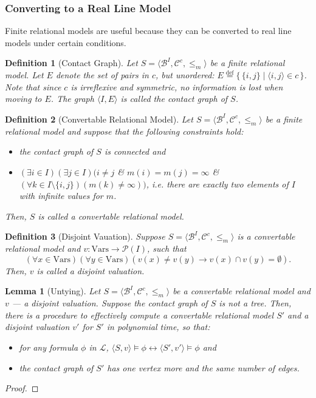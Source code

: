 \documentclass{article}
\newtheorem*{definition}{Definition}
\newtheorem*{lemma}{Lemma}
\newcommand{\pwrset}{\mathcal{P}}
\newcommand{\B}{\mathcal{B}}
\newcommand{\lang}{\mathcal{L}}
\newcommand{\Vars}{\text{Vars}}
\newcommand{\eqdef}{\stackrel{\text{def}}{=}}
\begin{document}
\subsubsection{Converting to a Real Line Model}
Finite relational models are useful because they can be converted to real line models under certain conditions.
\begin{definition}[Contact Graph]
  Let $S = \langle \B^I, \mathcal{C}^c, \leq_m \rangle$ be a finite relational model. Let $E$ denote the set of pairs in $c$, but unordered: $E \eqdef \{\, \{i, j\} \mid \langle i, j \rangle \in c \,\}$. Note that since $c$ is irreflexive and symmetric, no information is lost when moving to $E$.
  The graph $\langle I, E \rangle$ is called the \emph{contact graph} of $S$.
\end{definition}
\begin{definition}[Convertable Relational Model]
Let $S = \langle \B^I, \mathcal{C}^c, \leq_m \rangle$ be a finite relational model and suppose that the following constraints hold:
\begin{itemize}
\item the contact graph of $S$ is connected and
\item $(\exists i \in I)(\exists j \in I)(i \neq j$ \& $m(i) = m(j) = \infty$ \& $(\forall k \in I\setminus\{i, j\})(m(k) \neq \infty))$, i.e. there are exactly two elements of $I$ with infinite values for $m$.
\end{itemize}
Then, $S$ is called a \emph{convertable relational model}.
\end{definition}

\begin{definition}[Disjoint Vauation]
  Suppose $S = \langle \B^I, \mathcal{C}^c, \leq_m \rangle$ is a convertable relational model and $v: \Vars \rightarrow \pwrset(I)$, such that
\begin{equation*}
(\forall x \in \Vars)(\forall y \in \Vars)(v(x) \neq v(y) \rightarrow v(x) \cap v(y) = \emptyset).
\end{equation*}
Then, $v$ is called a \emph{disjoint valuation}.
\end{definition}

\begin{lemma}[Untying]
  Let $S = \langle \B^I, \mathcal{C}^c, \leq_m \rangle$ be a convertable relational model and $v$ --- a disjoint valuation. Suppose the contact graph of $S$ is not a tree.
  Then, there is a procedure to effectively compute a convertable relational model $S'$ and a disjoint valuation $v'$ for $S'$ in polynomial time, so that:
  \begin{itemize}
  \item for any formula $\phi$ in $\lang$, $\langle S, v \rangle \models \phi \longleftrightarrow \langle S', v' \rangle \models \phi$ and
  \item the contact graph of $S'$ has one vertex more and the same number of edges.
  \end{itemize}
\end{lemma}
\begin{proof}
\end{proof}
\end{document}
